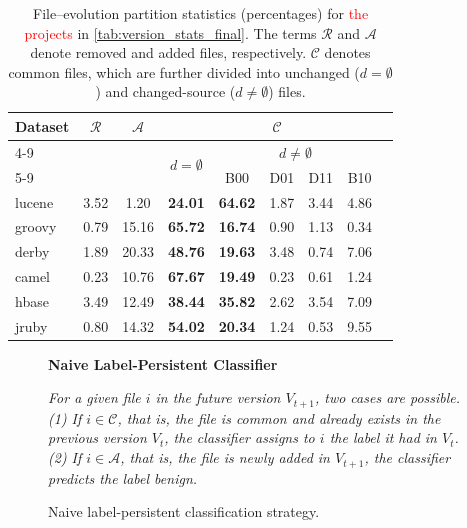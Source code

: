 \documentclass[authoryear,final,5p,times,twocolumn]{elsarticle}
\theoremstyle{plain}
\begin{document}
\begin{table}[!htbp]
\centering
\caption{File--evolution partition statistics (percentages) for \textcolor{red}{the projects} in \autoref{tab:version_stats_final}. 
The terms $\mathcal{R}$ and $\mathcal{A}$ denote removed and added files, respectively.
$\mathcal{C}$ denotes common files, which are further divided into unchanged
($d=\emptyset$) and changed-source ($d\neq\emptyset$) files.}
\label{tab:file_evolution_partition}
\small
\setlength{\tabcolsep}{4pt}
\renewcommand{\arraystretch}{1.15}
\begin{tabular}{lcccccccc}
\toprule
\multirow{3}{*}{\textbf{Dataset}}
& \multirow{3}{*}{$\mathcal{R}$}
& \multirow{3}{*}{$\mathcal{A}$}
& \multicolumn{6}{c}{$\mathcal{C}$} \\
\cmidrule(lr){4-9}
& & 
& \multirow{2}{*}{$d=\emptyset$}
& \multicolumn{4}{c}{$d \neq \emptyset$} \\
\cmidrule(lr){5-9}
& & & 
& B00 & D01 & D11 & B10 \\
\midrule
lucene & 3.52 & 1.20 & \cellcolor{gray!20}\textbf{24.01} & \cellcolor{gray!20}\textbf{64.62} & 1.87 & 3.44 & 4.86 \\
groovy & 0.79 & 15.16 & \cellcolor{gray!20}\textbf{65.72} & \cellcolor{gray!20}\textbf{16.74} & 0.90 & 1.13 & 0.34 \\
derby  & 1.89 & 20.33 & \cellcolor{gray!20}\textbf{48.76} & \cellcolor{gray!20}\textbf{19.63} & 3.48 & 0.74 & 7.06 \\
camel  & 0.23 & 10.76 & \cellcolor{gray!20}\textbf{67.67} & \cellcolor{gray!20}\textbf{19.49} & 0.23 & 0.61 & 1.24 \\
hbase  & 3.49 & 12.49 & \cellcolor{gray!20}\textbf{38.44} & \cellcolor{gray!20}\textbf{35.82} & 2.62 & 3.54 & 7.09 \\
jruby  & 0.80 & 14.32 & \cellcolor{gray!20}\textbf{54.02} & \cellcolor{gray!20}\textbf{20.34} & 1.24 & 0.53 & 9.55 \\
\bottomrule
\end{tabular}
\end{table}

\begin{figure}[!htbp]
\centering
\begin{mdframed}
\begin{center}
\textbf{Naive Label-Persistent Classifier}
\end{center}


\begin{center}
\itshape
For a given file $i$ in the future version $V_{t+1}$, two cases are possible.
(1) If $i \in \mathcal{C}$, that is, the file is common and already exists in the
previous version $V_t$, the classifier assigns to $i$ the label it had in $V_t$.
(2) If $i \in \mathcal{A}$, that is, the file is newly added in $V_{t+1}$, the
classifier predicts the label \textit{benign}.
\end{center}
\end{mdframed}
\caption{Naive label-persistent classification strategy.}
\label{fig:naive_classifier}
\end{figure}
\end{document}
